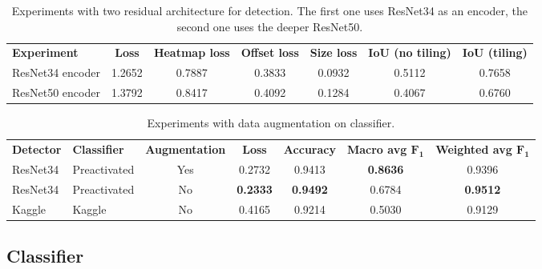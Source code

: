 \begin{table*}
	\begin{tabular}{lcccccc}
		\rowcolor[HTML]{EFEFEF} 
		\textbf{Experiment}   & \textbf{Loss} & \textbf{Heatmap loss} & \textbf{Offset loss} & \textbf{Size loss} & \textbf{IoU (no tiling)} & \textbf{IoU (tiling)} \\
		ResNet34 encoder      & 1.2652        & 0.7887                & 0.3833               & 0.0932             & 0.5112                   & 0.7658                \\
		ResNet50 encoder      & 1.3792        & 0.8417                & 0.4092               & 0.1284             & 0.4067                   & 0.6760
	\end{tabular}
	\caption{Experiments with two residual architecture for detection. The first one uses ResNet34 as an encoder, the second one uses the deeper ResNet50.}
	\label{tab:expdetector}
\end{table*}

\begin{table*}
	\begin{tabular}{llccccc}
		\rowcolor[HTML]{EFEFEF} 
		\textbf{Detector} & \textbf{Classifier} & \textbf{Augmentation} & \textbf{Loss} & \textbf{Accuracy} & \textbf{Macro avg $\mathbf{F_1}$} & \textbf{Weighted avg $\mathbf{F_1}$} \\
		ResNet34          & Preactivated        & Yes                   & 0.2732        & 0.9413  & \textbf{0.8636} & 0.9396     \\
		ResNet34          & Preactivated        & No                    & \textbf{0.2333}        &  \textbf{0.9492} & 0.6784    & \textbf{0.9512}           \\
		Kaggle          & Kaggle    & No                   & 0.4165           & 0.9214     & 0.5030 & 0.9129         
	\end{tabular}
	\caption{Experiments with data augmentation on classifier.}
	\label{tab:classres}
\end{table*}

\subsection{Classifier}
\label{ssec:classifierexp}

